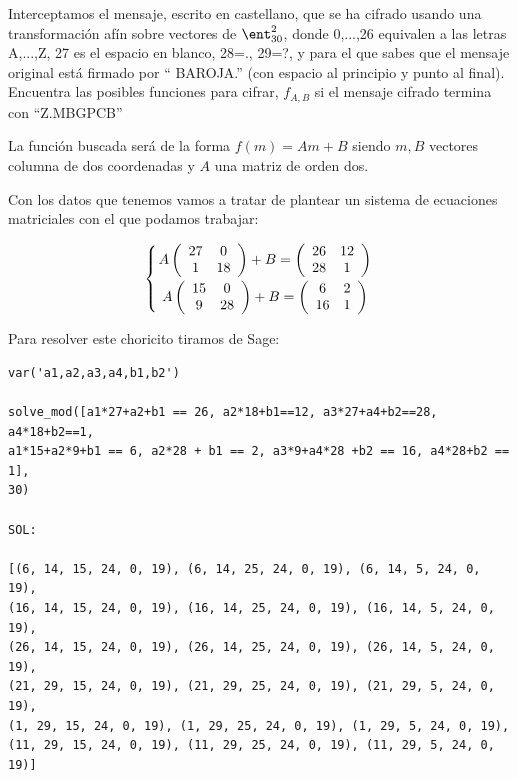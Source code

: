 \begin{problem}[6]
Interceptamos el mensaje, escrito en castellano, que se ha cifrado usando una transformación afín sobre vectores de $\ent_{30}^2$, donde 0,...,26 equivalen a las letras A,...,Z, 27 es el espacio en blanco, 28=., 29=?, y para el que sabes que el mensaje original está firmado por `` BAROJA.'' (con espacio al principio y punto al final). Encuentra las posibles funciones para cifrar, $f_{A,B}$ si el mensaje cifrado termina con ``Z.MBGPCB''

\solution


La función buscada será de la forma $f(m)=Am+B$ siendo $m,B$ vectores columna de dos coordenadas y $A$ una matriz de orden dos.

Con los datos que tenemos vamos a tratar de plantear un sistema de ecuaciones matriciales con el que podamos trabajar:

\[\left\{A \left( \begin{array}{cc}
		27 & 0 \\
		1 & 18
	\end{array} \right) + B = \left( \begin{array}{cc}
		26 & 12 \\
		28 & 1
	\end{array} \right) \atop A \left( \begin{array}{cc}
		15 & 0 \\
		9 & 28
	\end{array} \right) + B = \left( \begin{array}{cc}
		6 & 2 \\
		16 & 1
	\end{array} \right)\right.\]

Para resolver este choricito tiramos de Sage:

\begin{verbatim}
var('a1,a2,a3,a4,b1,b2')

solve_mod([a1*27+a2+b1 == 26, a2*18+b1==12, a3*27+a4+b2==28, a4*18+b2==1,
a1*15+a2*9+b1 == 6, a2*28 + b1 == 2, a3*9+a4*28 +b2 == 16, a4*28+b2 == 1],
30)

SOL:

[(6, 14, 15, 24, 0, 19), (6, 14, 25, 24, 0, 19), (6, 14, 5, 24, 0, 19),
(16, 14, 15, 24, 0, 19), (16, 14, 25, 24, 0, 19), (16, 14, 5, 24, 0, 19),
(26, 14, 15, 24, 0, 19), (26, 14, 25, 24, 0, 19), (26, 14, 5, 24, 0, 19),
(21, 29, 15, 24, 0, 19), (21, 29, 25, 24, 0, 19), (21, 29, 5, 24, 0, 19),
(1, 29, 15, 24, 0, 19), (1, 29, 25, 24, 0, 19), (1, 29, 5, 24, 0, 19),
(11, 29, 15, 24, 0, 19), (11, 29, 25, 24, 0, 19), (11, 29, 5, 24, 0, 19)]
\end{verbatim}


\end{problem}
